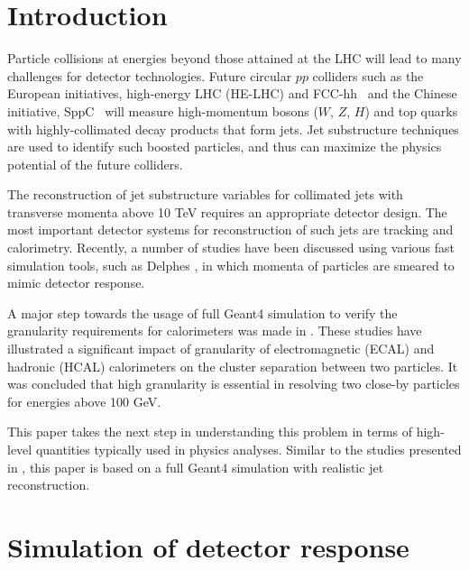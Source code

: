 \documentclass[final,1p,11pt]{elsarticle}
\begin{document}
\linenumbers

\section{Introduction}

Particle collisions at energies  beyond those attained at the LHC will lead to many challenges for detector technologies.
Future circular $pp$ colliders such as the European initiatives, high-energy LHC (HE-LHC) and FCC-hh~\cite{Benedikt:2206376} and the Chinese initiative, SppC~\cite{Tang:2015qga} will measure high-momentum bosons ($W$, $Z$, $H$) and top quarks with highly-collimated decay products that form jets. 
Jet substructure techniques are used
to identify such boosted particles, and thus can maximize the physics potential of the future colliders.

The reconstruction of jet substructure  variables for collimated jets with transverse momenta above 10 TeV 
requires an appropriate detector design. The most important detector systems for reconstruction of such jets are tracking and calorimetry.
Recently, a number of studies \cite{Calkins:2013ega,Chekanov:2015ihl,Coleman:2017fiq} 
have been discussed using various fast simulation tools, such as 
Delphes  \cite{deFavereau:2013fsa}, in which momenta of particles
are smeared to mimic detector response. 

A major step towards the usage of full Geant4 simulation to verify the granularity requirements 
for calorimeters was made in \cite{Chekanov:2016ppq}.
These studies have illustrated a significant impact 
of granularity of electromagnetic (ECAL) and hadronic (HCAL) calorimeters on the
cluster separation between two particles. It was concluded that high granularity is essential 
in resolving two close-by particles for energies above 100 GeV. 

This paper takes the next step in  understanding this problem in terms of high-level quantities typically used in physics analyses. Similar to the studies presented in \cite{Chekanov:2016ppq}, this paper is based on a full
Geant4 simulation with realistic jet reconstruction.

\section{Simulation of detector response}
\label{sec:sim}
\end{document}

